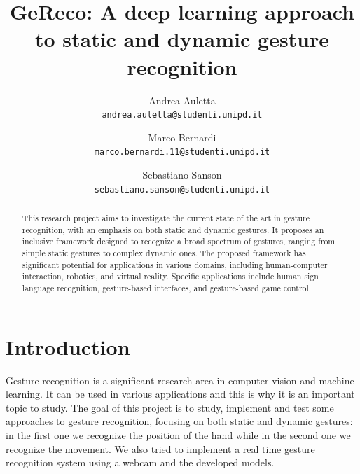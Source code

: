 \documentclass[10pt,twocolumn,letterpaper]{article}
\begin{document}
\title{GeReco: A deep learning approach to static and dynamic gesture recognition}

\author{Andrea Auletta\\
{\tt\small andrea.auletta@studenti.unipd.it}
\and
Marco Bernardi\\
{\tt\small marco.bernardi.11@studenti.unipd.it}
\and
Sebastiano Sanson\\
{\tt\small sebastiano.sanson@studenti.unipd.it}
}

\maketitle

\begin{abstract}
   This research project aims to investigate the current state of the art in gesture recognition, with an emphasis on both static and dynamic gestures. 
   It proposes an inclusive framework designed to recognize a broad spectrum of gestures, ranging from simple static gestures to complex dynamic ones. 
   The proposed framework has significant potential for applications in various domains, including human-computer interaction, robotics, and virtual reality. 
   Specific applications include human sign language recognition, gesture-based interfaces, and gesture-based game control.
\end{abstract}


\section{Introduction}
Gesture recognition is a significant research area in computer vision and machine learning. It can be used in various applications and this is why it is an important topic to study.
The goal of this project is to study, implement and test some approaches to gesture recognition, focusing on both static and dynamic gestures: in the first one we recognize the position of 
the hand while in the second one we recognize the movement. 
We also tried to implement a real time gesture recognition system using a webcam and the developed models.
\end{document}

